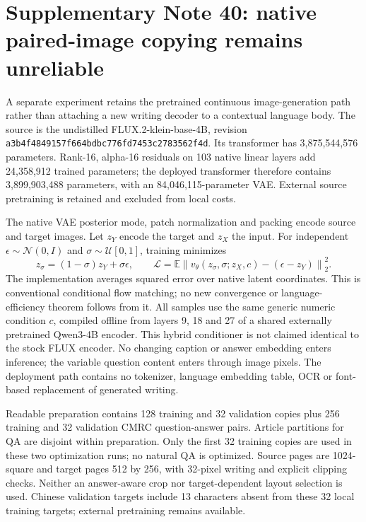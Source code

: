 \documentclass[10pt,a4paper]{article}
\begin{document}
\clearpage
\section*{Supplementary Note 40: native paired-image copying remains unreliable}
A separate experiment retains the pretrained continuous image-generation path
rather than attaching a new writing decoder to a contextual language body.
The source is the undistilled FLUX.2-klein-base-4B, revision
\texttt{a3b4f4849157f664bdbc776fd7453c2783562f4d}. Its transformer has
3,875,544,576 parameters. Rank-16, alpha-16 residuals on 103 native linear
layers add 24,358,912 trained parameters; the deployed transformer therefore
contains 3,899,903,488 parameters, with an 84,046,115-parameter VAE. External
source pretraining is retained and excluded from local costs.

The native VAE posterior mode, patch normalization and packing encode source
and target images. Let $z_Y$ encode the target and $z_X$ the input. For independent
$\epsilon\sim\mathcal N(0,I)$ and $\sigma\sim\mathcal U[0,1]$, training minimizes
\[
 z_\sigma=(1-\sigma)z_Y+\sigma\epsilon,\qquad
 \mathcal L=\mathbb E\left\|v_\theta(z_\sigma,\sigma;z_X,c)
                 -(\epsilon-z_Y)\right\|_2^2.
\]
The implementation averages squared error over native latent coordinates.
This is conventional conditional flow matching; no new convergence or
language-efficiency theorem follows from it. All samples use the same generic
numeric condition $c$, compiled offline from layers 9, 18 and 27 of a shared
externally pretrained Qwen3-4B encoder. This hybrid conditioner is not claimed
identical to the stock FLUX encoder. No changing caption or answer embedding
enters inference; the variable question content enters through image pixels.
The deployment path contains no tokenizer, language embedding table, OCR or
font-based replacement of generated writing.

Readable preparation contains 128 training and 32 validation copies plus
256 training and 32 validation CMRC question-answer pairs. Article partitions
for QA are disjoint within preparation. Only the first 32 training copies are
used in these two optimization runs; no natural QA is optimized. Source pages
are 1024-square and target pages 512 by 256, with 32-pixel writing and explicit
clipping checks. Neither an answer-aware crop nor target-dependent layout
selection is used. Chinese validation targets include 13 characters absent
from these 32 local training targets; external pretraining remains available.
\end{document}
